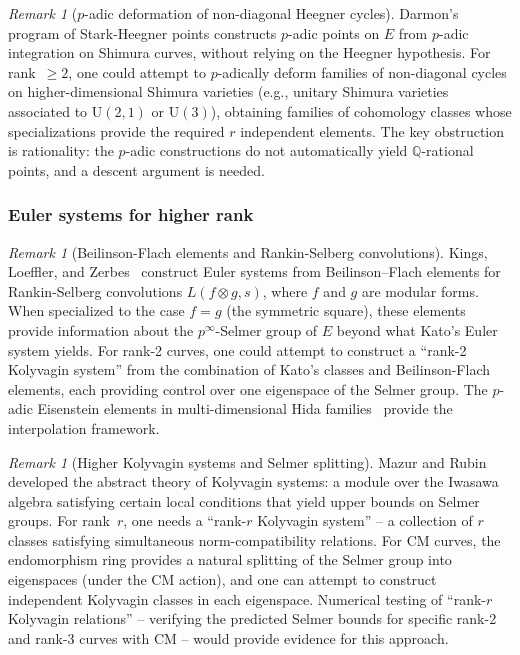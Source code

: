 \documentclass[aps,prd,twocolumn,superscriptaddress,nofootinbib]{revtex4-2}
\theoremstyle{definition}
\theoremstyle{remark}
\newtheorem{remark}[theorem]{Remark}
\begin{document}
\begin{remark}[$p$-adic deformation of non-diagonal Heegner cycles]
\label{rem:p-adic-deformation}
Darmon's program of Stark-Heegner points constructs $p$-adic points on $E$ from $p$-adic integration on Shimura curves, without relying on the Heegner hypothesis. For rank~$\geq 2$, one could attempt to $p$-adically deform families of non-diagonal cycles on higher-dimensional Shimura varieties (e.g., unitary Shimura varieties associated to $\mathrm{U}(2,1)$ or $\mathrm{U}(3)$), obtaining families of cohomology classes whose specializations provide the required $r$ independent elements. The key obstruction is rationality: the $p$-adic constructions do not automatically yield $\mathbb{Q}$-rational points, and a descent argument is needed.
\end{remark}

\subsubsection{Euler systems for higher rank}

\begin{remark}[Beilinson-Flach elements and Rankin-Selberg convolutions]
\label{rem:beilinson-flach}
Kings, Loeffler, and Zerbes~\cite{KLZ2017} construct Euler systems from Beilinson--Flach elements for Rankin-Selberg convolutions $L(f \otimes g, s)$, where $f$ and $g$ are modular forms. When specialized to the case $f = g$ (the symmetric square), these elements provide information about the $p^\infty$-Selmer group of $E$ beyond what Kato's Euler system yields. For rank-2 curves, one could attempt to construct a ``rank-2 Kolyvagin system'' from the combination of Kato's classes and Beilinson-Flach elements, each providing control over one eigenspace of the Selmer group. The $p$-adic Eisenstein elements in multi-dimensional Hida families~\cite{LLZ2014} provide the interpolation framework.
\end{remark}

\begin{remark}[Higher Kolyvagin systems and Selmer splitting]
\label{rem:kolyvagin-higher}
Mazur and Rubin~\cite{MazurRubin2004} developed the abstract theory of Kolyvagin systems: a module over the Iwasawa algebra satisfying certain local conditions that yield upper bounds on Selmer groups. For rank~$r$, one needs a ``rank-$r$ Kolyvagin system'' -- a collection of $r$ classes satisfying simultaneous norm-compatibility relations. For CM curves, the endomorphism ring provides a natural splitting of the Selmer group into eigenspaces (under the CM action), and one can attempt to construct independent Kolyvagin classes in each eigenspace. Numerical testing of ``rank-$r$ Kolyvagin relations'' -- verifying the predicted Selmer bounds for specific rank-2 and rank-3 curves with CM -- would provide evidence for this approach.
\end{remark}
\end{document}
